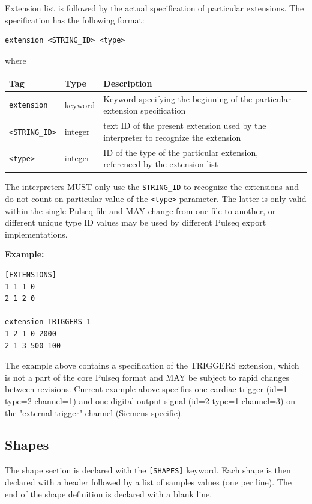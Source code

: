 \documentclass{article}
\begin{document}
Extension list is followed by the actual specification of particular extensions. The specification has the following format:

\begin{lstlisting}
extension <STRING_ID> <type>
\end{lstlisting}

where 

\begin{tabularx}{\textwidth}{llXl}
\toprule
Tag & Type & Description \\
\midrule
\verb.extension. & keyword & Keyword specifying the beginning of the particular extension specification \\
\verb.<STRING_ID>. & integer & text ID of the present extension used by the interpreter to recognize the extension \\
\verb.<type>. & integer & ID of the type of the particular extension, referenced by the extension list \\
\bottomrule
\end{tabularx}

The interpreters MUST only use the \verb.STRING_ID. to recognize the extensions and do not count on particular value of the \verb.<type>. parameter. The latter is only valid within the single Pulseq file and MAY change from one file to another, or different unique type ID values may be used by different Pulseq export implementations.

\begin{minipage}{\textwidth}
\textbf{Example:}
\begin{lstlisting}
[EXTENSIONS]
1 1 1 0
2 1 2 0

extension TRIGGERS 1
1 2 1 0 2000
2 1 3 500 100
\end{lstlisting}
\end{minipage}

The example above contains a specification of the TRIGGERS extension, which is not a part of the core Pulseq format and MAY be subject to rapid changes between revisions. Current example above specifies one cardiac trigger (id=1 type=2 channel=1) and one digital output signal (id=2 type=1 channel=3) on the "external trigger" channel (Siemens-specific).

\subsection{Shapes}

The shape section is declared with the \verb.[SHAPES]. keyword. Each shape is then declared with a header followed by a list of samples values (one per line). The end of the shape definition is declared with a blank line.
\end{document}
